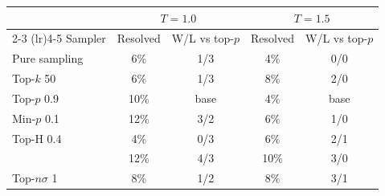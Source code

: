 \begin{tabular}{lcccc}
\toprule
 & \multicolumn{2}{c}{$T{=}1.0$} & \multicolumn{2}{c}{$T{=}1.5$} \\
\cmidrule(lr){2-3} \cmidrule(lr){4-5}
Sampler & Resolved & W/L vs top-$p$ & Resolved & W/L vs top-$p$ \\
\midrule
Pure sampling & 6\% & 1/3 & 4\% & 0/0 \\
Top-$k$ 50 & 6\% & 1/3 & 8\% & 2/0 \\
Top-$p$ 0.9 & 10\% & base & 4\% & base \\
Min-$p$ 0.1 & 12\% & 3/2 & 6\% & 1/0 \\
Top-H 0.4 & 4\% & 0/3 & 6\% & 2/1 \\
\pless{} & 12\% & 4/3 & 10\% & 3/0 \\
Top-$n\sigma$ 1 & 8\% & 1/2 & 8\% & 3/1 \\
\bottomrule
\end{tabular}
